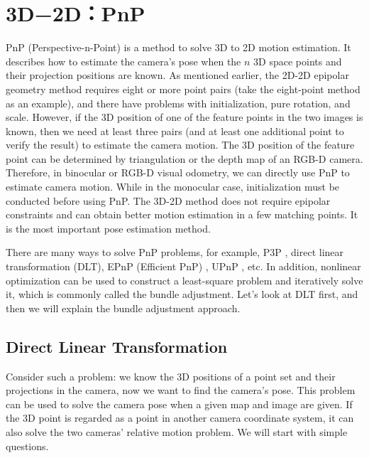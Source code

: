 \section{3D−2D：PnP}
PnP (Perspective-n-Point) is a method to solve 3D to 2D motion estimation. It describes how to estimate the camera's pose when the $n$ 3D space points and their projection positions are known. As mentioned earlier, the 2D-2D epipolar geometry method requires eight or more point pairs (take the eight-point method as an example), and there have problems with initialization, pure rotation, and scale. However, if the 3D position of one of the feature points in the two images is known, then we need at least three pairs (and at least one additional point to verify the result) to estimate the camera motion. The 3D position of the feature point can be determined by triangulation or the depth map of an RGB-D camera. Therefore, in binocular or RGB-D visual odometry, we can directly use PnP to estimate camera motion. While in the monocular case, initialization must be conducted before using PnP. The 3D-2D method does not require epipolar constraints and can obtain better motion estimation in a few matching points. It is the most important pose estimation method.

There are many ways to solve PnP problems, for example, P3P {\cite{GaoHouTangEtAl2003}}, direct linear transformation (DLT), EPnP (Efficient PnP) {\cite{LepetitMoreno-NoguerFua2008}}, UPnP {\cite{Penate-SanchezAndrade-CettoMoreno-Noguer2013}}, etc. In addition, nonlinear optimization can be used to construct a least-square problem and iteratively solve it, which is commonly called the bundle adjustment. Let's look at DLT first, and then we will explain the bundle adjustment approach.

\subsection{Direct Linear Transformation}
Consider such a problem: we know the 3D positions of a point set and their projections in the camera, now we want to find the camera's pose. This problem can be used to solve the camera pose when a given map and image are given. If the 3D point is regarded as a point in another camera coordinate system, it can also solve the two cameras' relative motion problem. We will start with simple questions.

